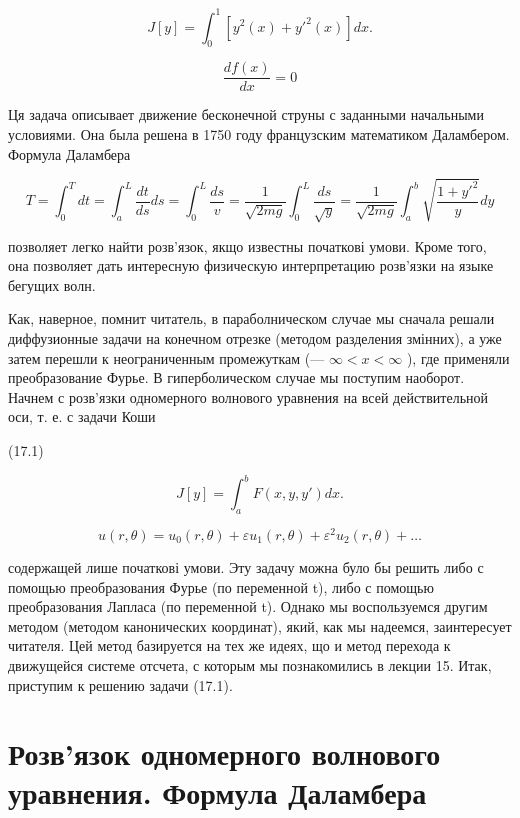 \documentclass[
  ukrainian,
]{article}
\begin{document}
\[
J[y] = \int_{0}^{1} [y^{2}(x) + y'^{2}(x)] dx.
\]

\[
\frac{df(x)}{dx} = 0
\]

Ця задача описывает движение бесконечной струны с заданными начальными
условиями. Она была решена в 1750 году французским математиком
Даламбером. Формула Даламбера

\[
T = \int_{0}^{T} dt = \int_{a}^{L} \frac{dt}{ds} ds = \int_{0}^{L} \frac{ds}{v} = \frac{1}{\sqrt{2mg}} \int_{0}^{L} \frac{ds}{\sqrt{y}} = \frac{1}{\sqrt{2mg}} \int_{a}^{b} \sqrt{\frac{1+y'^{2}}{y}} dy
\]

позволяет легко найти розв'язок, якщо известны початкові умови. Кроме
того, она позволяет дать интересную физическую интерпретацию розв'язки
на языке бегущих волн.

Как, наверное, помнит читатель, в параболническом случае мы сначала
решали диффузионные задачи на конечном отрезке (методом разделения
змінних), а уже затем перешли к неограниченным промежуткам (---
\(\infty < x < \infty\) ), где применяли преобразование Фурье. В
гиперболическом случае мы поступим наоборот. Начнем с розв'язки
одномерного волнового уравнения на всей действительной оси, т. е. с
задачи Коши

(17.1)

\[
J[y] = \int_{a}^{b} F(x, y, y') dx.
\]

\[
u(r, \theta) = u_0(r, \theta) + \varepsilon u_1(r, \theta) + \varepsilon^2 u_2(r, \theta) + \dots
\]

содержащей лише початкові умови. Эту задачу можна було бы решить либо с
помощью преобразования Фурье (по переменной t), либо с помощью
преобразования Лапласа (по переменной t). Однако мы воспользуемся другим
методом (методом канонических координат), який, как мы надеемся,
заинтересует читателя. Цей метод базируется на тех же идеях, що и метод
перехода к движущейся системе отсчета, с которым мы познакомились в
лекции 15. Итак, приступим к решению задачи (17.1).

\section{Розв'язок одномерного волнового уравнения. Формула
Даламбера}\label{ux440ux43eux437ux432ux44fux437ux43eux43a-ux43eux434ux43dux43eux43cux435ux440ux43dux43eux433ux43e-ux432ux43eux43bux43dux43eux432ux43eux433ux43e-ux443ux440ux430ux432ux43dux435ux43dux438ux44f.-ux444ux43eux440ux43cux443ux43bux430-ux434ux430ux43bux430ux43cux431ux435ux440ux430}
\end{document}
